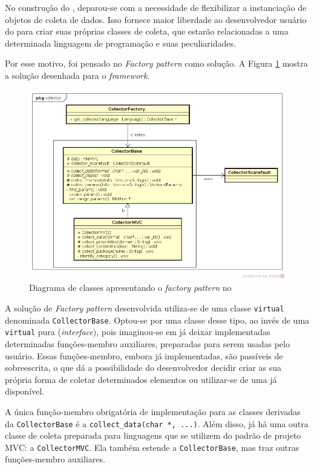 No construção do \scarefault, deparou-se com a necessidade de flexibilizar
a instanciação de objetos de coleta de dados. Isso fornece maior liberdade
ao desenvolvedor usuário do \framework para criar suas próprias classes de
coleta, que estarão relacionadas a uma determinada linguagem de programação
e suas peculiaridades.

Por esse motivo, foi pensado no \textit{Factory pattern} como solução. A Figura
\ref{collector-diagram} mostra a solução desenhada para o \textit{framework}.


\begin{figure}[h]
  \centering
    \includegraphics[width=\textwidth]{figuras/collector-diagram.png}
    \caption{Diagrama de classes apresentando o \textit{factory pattern} no \framework}
    \label{collector-diagram}
\end{figure}
\FloatBarrier

A solução de \textit{Factory pattern} desenvolvida utiliza-se de uma classe
\lstinline|virtual| denominada \lstinline|CollectorBase|. Optou-se por uma classe
desse tipo, ao invés de uma \lstinline|virtual| pura (\textit{interface}), pois
imaginou-se em já deixar implementadas determinadas funções-membro auxiliares,
preparadas para serem usadas pelo usuário. Essas funções-membro, embora já implementadas,
são passíveis de sobreescrita, o que dá a possibilidade do desenvolvedor
decidir criar as sua própria forma de coletar determinados elementos ou utilizar-se
de uma já disponível.

A única função-membro obrigatória de implementação para as classes derivadas da
\lstinline|CollectorBase| é a \lstinline|collect_data(char *, ...)|. Além disso, já
há uma outra classe de coleta preparada para linguagens que se utilizem do padrão
de projeto MVC: a \lstinline|CollectorMVC|. Ela também estende a \lstinline|CollectorBase|,
mas traz outras funções-membro auxiliares.

